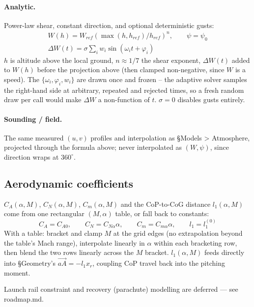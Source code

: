 \documentclass[10pt]{extarticle}
\numberwithin{equation}{subsubsection}
\begin{document}
\paragraph{Analytic.} Power-law shear, constant direction, and optional deterministic gusts:
\begin{gather}
    W(h) = W_{ref}\left(\max(h,h_{ref})/h_{ref}\right)^{n}, \qquad \psi = \psi_0 \\
    \Delta W(t) = \sigma\sum_i w_i\sin(\omega_it+\varphi_i)
\end{gather}
$h$ is altitude above the local ground, $n\approx1/7$ the shear exponent, $\Delta W(t)$ added to
$W(h)$ before the projection above (then clamped non-negative, since $W$ is a speed). The
$\{\omega_i,\varphi_i,w_i\}$ are drawn once and frozen -- the adaptive solver samples the
right-hand side at arbitrary, repeated and rejected times, so a fresh random draw per call would
make $\Delta W$ a non-function of $t$. $\sigma=0$ disables gusts entirely.

\paragraph{Sounding / field.} The same measured $(u,v)$ profiles and interpolation as
\S Models > Atmosphere, projected through the formula above; never interpolated as $(W,\psi)$,
since direction wraps at $360^\circ$.

\subsection{Aerodynamic coefficients}
$C_A(\alpha,M)$, $C_N(\alpha,M)$, $C_m(\alpha,M)$ and the CoP-to-CoG distance $l_1(\alpha,M)$ come
from one rectangular $(M,\alpha)$ table, or fall back to constants:
\begin{equation}
    C_A = C_{A0}, \qquad C_N = C_{N\alpha}\alpha, \qquad C_m = C_{m\alpha}\alpha, \qquad l_1 = l_1^{(0)}
\end{equation}
With a table: bracket and clamp $M$ at the grid edges (no extrapolation beyond the table's Mach
range), interpolate linearly in $\alpha$ within each bracketing row, then blend the two rows
linearly across the $M$ bracket. $l_1(\alpha,M)$ feeds directly into \S Geometry's
$\vec{aA}=-l_1\hat{x}_r$, coupling CoP travel back into the pitching moment.

Launch rail constraint and recovery (parachute) modelling are deferred --- see roadmap.md.
\end{document}
